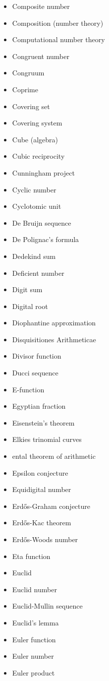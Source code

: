 \documentclass[12pt]{article}
\begin{document}
\begin{itemize}
\item Composite number 
\item Composition (number theory) 
\item Computational number theory 
\item Congruent number 
\item Congruum 
\item Coprime 
\item Covering set 
\item Covering system 
\item Cube (algebra) 
\item Cubic reciprocity 
\item Cunningham project 
\item Cyclic number 
\item Cyclotomic unit 
\item De Bruijn sequence 
\item De Polignac's formula 
\item Dedekind sum 
\item Deficient number 
\item Digit sum 
\item Digital root 
\item Diophantine approximation 
\item Disquisitiones Arithmeticae 
\item Divisor function 
\item Ducci sequence 
\item E-function 
\item Egyptian fraction 
\item Eisenstein's theorem 
\item Elkies trinomial curves 
\item ental theorem of arithmetic 
\item Epsilon conjecture 
\item Equidigital number 
\item Erd\H{o}s-Graham conjecture 
\item Erd\H{o}s-Kac theorem 
\item Erd\H{o}s-Woods number 
\item Eta function 
\item Euclid 
\item Euclid number 
\item Euclid-Mullin sequence 
\item Euclid's lemma 
\item Euler function 
\item Euler number 
\item Euler product 

\end{itemize}
\end{document}

